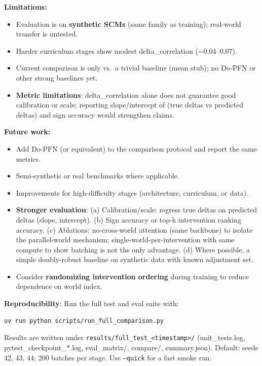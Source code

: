 \documentclass[12pt]{article}
\begin{document}
\textbf{Limitations:}

\begin{itemize}
    \item Evaluation is on \textbf{synthetic SCMs} (same family as training); real-world transfer is untested.
    \item Harder curriculum stages show modest delta\_correlation ($\sim 0.04$--$0.07$).
    \item Current comparison is only vs.\ a trivial baseline (mean stub); no Do-PFN or other strong baselines yet.
    \item \textbf{Metric limitations}: delta\_correlation alone does not guarantee good calibration or scale; reporting slope/intercept of (true deltas vs predicted deltas) and sign accuracy would strengthen claims.
\end{itemize}

\textbf{Future work:}

\begin{itemize}
    \item Add Do-PFN (or equivalent) to the comparison protocol and report the same metrics.
    \item Semi-synthetic or real benchmarks where applicable.
    \item Improvements for high-difficulty stages (architecture, curriculum, or data).
    \item \textbf{Stronger evaluation}: (a) Calibration/scale: regress true deltas on predicted deltas (slope, intercept). (b) Sign accuracy or top-k intervention ranking accuracy. (c) Ablations: no-cross-world attention (same backbone) to isolate the parallel-world mechanism; single-world-per-intervention with same compute to show batching is not the only advantage. (d) Where possible, a simple doubly-robust baseline on synthetic data with known adjustment set.
    \item Consider \textbf{randomizing intervention ordering} during training to reduce dependence on world index.
\end{itemize}

\textbf{Reproducibility}: Run the full test and eval suite with:

\begin{lstlisting}[language=bash]
uv run python scripts/run_full_comparison.py
\end{lstlisting}

Results are written under \texttt{results/full\_test\_<timestamp>/} (unit\_tests.log, pytest\_checkpoint\_*.log, eval\_matrix/, compare/, summary.json). Default: seeds 42, 43, 44; 200 batches per stage. Use \texttt{--quick} for a fast smoke run.
\end{document}
